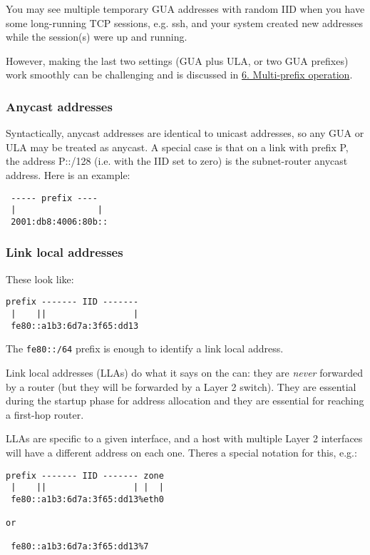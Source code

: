 \documentclass[
]{article}
\begin{document}
You may see multiple temporary GUA addresses with random IID when you
have some long-running TCP sessions, e.g. ssh, and your system created
new addresses while the session(s) were up and running.

However, making the last two settings (GUA plus ULA, or two GUA
prefixes) work smoothly can be challenging and is discussed in
\hyperref[multi-prefix-operation]{6. Multi-prefix operation}.

\subsubsection{Anycast addresses}\label{anycast-addresses}

Syntactically, anycast addresses are identical to unicast addresses, so
any GUA or ULA may be treated as anycast. A special case is that on a
link with prefix P, the address P::/128 (i.e. with the IID set to zero)
is the subnet-router anycast address. Here is an example:

\begin{verbatim}
 ----- prefix ----
 |                |
 2001:db8:4006:80b::
\end{verbatim}

\subsubsection{Link local addresses}\label{link-local-addresses}

These look like:

\begin{verbatim}
prefix ------- IID -------
 |    ||                 |
 fe80::a1b3:6d7a:3f65:dd13
\end{verbatim}

The \texttt{fe80::/64} prefix is enough to identify a link local
address.

Link local addresses (LLAs) do what it says on the can: they are
\emph{never} forwarded by a router (but they will be forwarded by a
Layer 2 switch). They are essential during the startup phase for address
allocation and they are essential for reaching a first-hop router.

LLAs are specific to a given interface, and a host with multiple Layer 2
interfaces will have a different address on each one.
There\textquotesingle s a special notation for this, e.g.:

\begin{verbatim}
prefix ------- IID ------- zone
 |    ||                 | |  |
 fe80::a1b3:6d7a:3f65:dd13%eth0

or

 fe80::a1b3:6d7a:3f65:dd13%7
\end{verbatim}
\end{document}
